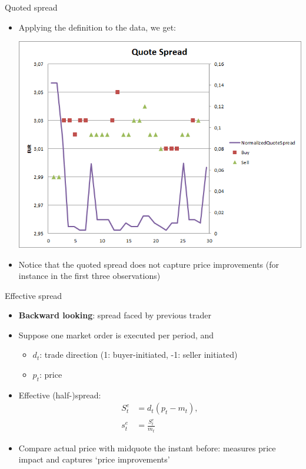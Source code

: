 \documentclass[english,10pt]{beamer}
\begin{document}
\begin{frame}{Quoted spread}
	\begin{itemize}
		\item Applying the definition to the data, we get:
		\begin{center}	
			\includegraphics[scale=0.35]{pics/L2_quotespread}
		\end{center}
		\item Notice that the quoted spread does not capture price improvements (for instance in the first three observations)
	\end{itemize}
\end{frame}


\begin{frame}{Effective spread}
	\begin{itemize}
		\item \textbf{Backward looking}: spread faced by previous trader
		\item Suppose one market order is executed per period, and
		\begin{itemize}
			\item $d_t$: trade direction (1: buyer-initiated, -1: seller initiated)
			\item $p_t$:  price
		\end{itemize}
		\item \alert{Effective (half-)spread}: 
		\begin{align*}
		S^e_t & = d_t(p_t-m_{t}), \\
		s^e_t & = \frac{S^e_t}{m_{t}}
		\end{align*}
		\item Compare actual price with midquote the instant before: measures price impact and captures `price improvements'
	\end{itemize}
\end{frame}
\end{document}
